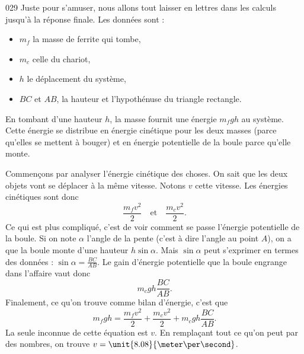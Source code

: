 

\begin{corrige}{029}
Juste pour s'amuser, nous allons tout laisser en lettres dans les calculs jusqu'à la réponse finale. Les données sont :

\begin{itemize}
\item $m_f$ la masse de ferrite qui tombe,
\item $m_c$ celle du chariot,
\item $h$ le déplacement du système,
\item $BC$ et $AB$, la hauteur et l'hypothénuse du triangle rectangle.
\end{itemize}

En tombant d'une hauteur $h$, la masse fournit une énergie $m_fgh$ au système. Cette énergie se distribue en énergie cinétique pour les deux masses (parce qu'elles se mettent à bouger) et en énergie potentielle de la boule parce qu'elle monte. 

Commençons par analyser l'énergie cinétique des choses. On sait que les deux objets vont se déplacer à la même vitesse. Notons $v$ cette vitesse. Les énergies cinétiques sont donc
\[ 
  \frac{ m_fv^2 }{ 2 }\quad\text{et}\quad\frac{ m_cv^2 }{ 2 }.
\]
Ce qui est plus compliqué, c'est de voir comment se passe l'énergie potentielle de la boule. Si on note $\alpha$ l'angle de la pente (c'est à dire l'angle au point $A$), on a que la boule monte d'une hauteur $h\sin\alpha$. Mais $\sin\alpha$ peut s'exprimer en termes des données : $\sin\alpha=\frac{ BC }{ AB }$. Le gain d'énergie potentielle que la boule engrange dans l'affaire vaut donc
\[ 
  m_cgh\frac{ BC }{ AB }.
\]
Finalement, ce qu'on trouve comme bilan d'énergie, c'est que
\[ 
  m_fgh=\frac{ m_fv^2 }{ 2 }+\frac{ m_cv^2 }{ 2 }+m_cgh\frac{ BC }{ AB }.
\]
La seule inconnue de cette équation est $v$. En remplaçant tout ce qu'on peut par des nombres, on trouve $v=\unit{8.08}{\meter\per\second}$.
                   


\end{corrige}
